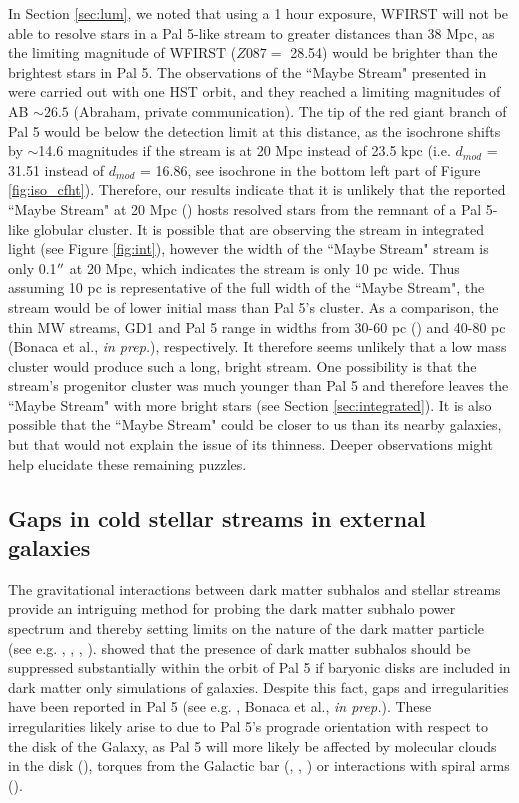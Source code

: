\documentclass[twocolumn]{aastex62}
\begin{document}
In Section \ref{sec:lum}, we noted that using a 1 hour exposure, WFIRST will not be able to resolve stars in a Pal 5-like stream to greater distances than 38 Mpc, as the limiting magnitude of WFIRST ($Z087 = $ 28.54) would be brighter than the brightest stars in Pal 5. %
The observations of the ``Maybe Stream" presented in \citet{abraham18}  were carried out with one HST orbit, and they reached a limiting magnitudes of AB ${\sim} 26.5$ (Abraham, private communication). The tip of the red giant branch of Pal 5 would be below the detection limit at this distance, as the isochrone shifts by ${\sim}$14.6 magnitudes if the stream is at 20 Mpc instead of 23.5 kpc (i.e. $d_{mod}$ =  31.51 instead of $d_{mod}$ = 16.86, see isochrone in the bottom left part of Figure \ref{fig:iso_cfht}). Therefore, our results indicate that it is unlikely that the reported ``Maybe Stream" at 20 Mpc (\citealt{abraham18}) hosts resolved stars from the remnant of a Pal 5-like globular cluster. It is possible that \citet{abraham18} are observing the stream in integrated light (see Figure \ref{fig:int}), however the width of the ``Maybe Stream" stream is only 0.1$\mbox{$^{\prime\prime}$}$ at 20 Mpc, which indicates the stream is only 10 pc wide. Thus assuming 10 pc is representative of the full width of the ``Maybe Stream", the stream would be of lower initial mass than Pal 5's cluster. As a comparison, the thin MW streams, GD1 and Pal 5 range in widths from 30-60 pc (\citealt{price18}) and 40-80 pc (Bonaca et al., {\it in prep.}), respectively. It therefore seems unlikely that a low mass cluster would produce such a long, bright stream. One possibility is that the stream's progenitor cluster was much younger than Pal 5 and therefore leaves the ``Maybe Stream" with more bright stars (see  Section \ref{sec:integrated}). It is also possible that the  ``Maybe Stream" could be closer to us than its nearby galaxies, but that would not explain the issue of its thinness. Deeper observations might help elucidate these remaining puzzles. 

\subsection{Gaps in cold stellar streams in external galaxies}
\label{sec:gaps}
The gravitational interactions between dark matter subhalos and stellar streams provide an intriguing method for probing the dark matter subhalo power spectrum and thereby setting limits on the nature of the dark matter particle (see e.g. \citealt{erkal16}, \citealt{bovy17}, \citealt{price18}, \citealt{bonaca19}). \citet{garrison17} showed that the presence of dark matter subhalos should be suppressed substantially within the orbit of Pal 5 if baryonic disks are included in dark matter only simulations of galaxies.  Despite this fact, gaps and irregularities have been reported in Pal 5 (see e.g. \citealt{erkal17}, Bonaca et al., {\it in prep.}). These irregularities likely arise to due to Pal 5's prograde orientation with respect to the disk of the Galaxy, as Pal 5 will more likely be affected by molecular clouds in the disk (\citealt{amorisco16}), torques from the Galactic bar (\citealt{hattori16}, \citealt{erkal17}, \citealt{pearson17}) or interactions with spiral arms (\citealt{banik19}).
\end{document}
